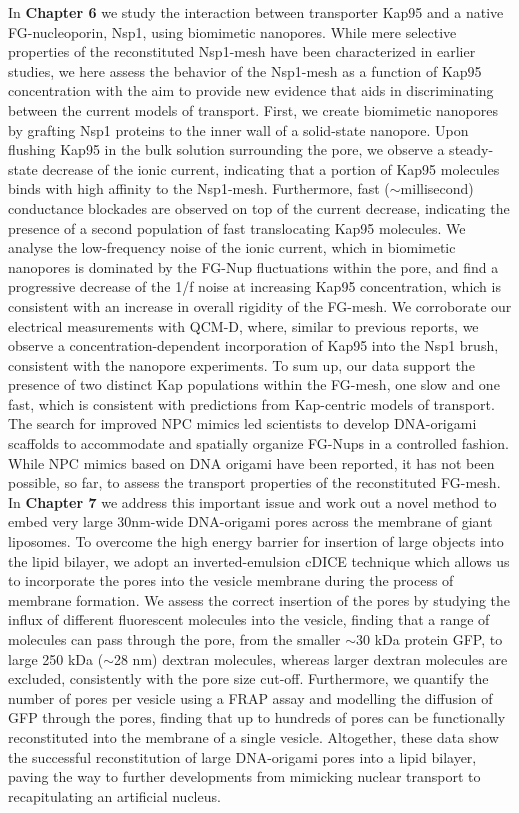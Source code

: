 \noindent In \textbf{Chapter 6} we study the interaction between transporter Kap95 and a native FG-nucleo\-porin, Nsp1, using biomimetic nanopores. While mere selective properties of the reconstituted Nsp1-mesh have been characterized in earlier studies, we here assess the behavior of the Nsp1-mesh as a function of Kap95 concentration with the aim to provide new evidence that aids in discriminating between the current models of transport. First, we create biomimetic nanopores by grafting Nsp1 proteins to the inner wall of a solid-state nanopore. Upon flushing Kap95 in the bulk solution surrounding the pore, we observe a steady-state decrease of the ionic current, indicating that a portion of Kap95 molecules binds with high affinity to the Nsp1-mesh. Furthermore, fast ($\sim$millisecond) conductance blockades are observed on top of the current decrease, indicating the presence of a second population of fast translocating Kap95 molecules. We analyse the low-frequency noise of the ionic current, which in biomimetic nanopores is dominated by the FG-Nup fluctuations within the pore, and find a progressive decrease of the 1/f noise at increasing Kap95 concentration, which is consistent with an increase in overall rigidity of the FG-mesh. We corroborate our electrical measurements with QCM-D, where, similar to previous reports, we observe a concentration-dependent incorporation of Kap95 into the Nsp1 brush, consistent with the nanopore experiments. To sum up, our data support the presence of two distinct Kap populations within the FG-mesh, one slow and one fast, which is consistent with predictions from Kap-centric models of transport.\\[0.5pt]

\noindent The search for improved NPC mimics led scientists to develop DNA-origami scaffolds to accommodate and spatially organize FG-Nups in a controlled fashion. While NPC mimics based on DNA origami have been reported, it has not been possible, so far, to assess the transport properties of the reconstituted FG-mesh. In \textbf{Chapter 7} we address this important issue and work out a novel method to embed very large 30nm-wide DNA-origami pores across the membrane of giant liposomes. To overcome the high energy barrier for insertion of large objects into the lipid bilayer, we adopt an inverted-emulsion cDICE technique which allows us to incorporate the pores into the vesicle membrane during the process of membrane formation. We assess the correct insertion of the pores by studying the influx of different fluorescent molecules into the vesicle, finding that a range of molecules can pass through the pore, from the smaller $\sim$30 kDa protein GFP, to large 250 kDa ($\sim$28 nm) dextran molecules, whereas larger dextran molecules are excluded, consistently with the pore size cut-off. Furthermore, we quantify the number of pores per vesicle using a FRAP assay and modelling the diffusion of GFP through the pores, finding that up to hundreds of pores can be functionally reconstituted into the membrane of a single vesicle. Altogether, these data show the successful reconstitution of large DNA-origami pores into a lipid bilayer, paving the way to further developments from mimicking nuclear transport to recapitulating an artificial nucleus.\\[0.5pt]

